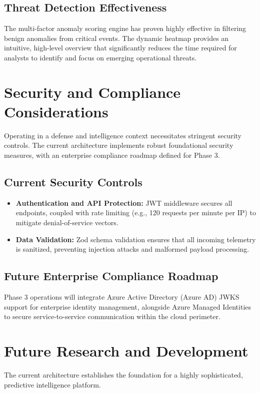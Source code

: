 \documentclass[11pt,a4paper]{article}
\begin{document}
\subsection{Threat Detection Effectiveness}
The multi-factor anomaly scoring engine has proven highly effective in filtering benign anomalies from critical events. The dynamic heatmap provides an intuitive, high-level overview that significantly reduces the time required for analysts to identify and focus on emerging operational threats.

\section{Security and Compliance Considerations}
Operating in a defense and intelligence context necessitates stringent security controls. The current architecture implements robust foundational security measures, with an enterprise compliance roadmap defined for Phase 3.

\subsection{Current Security Controls}
\begin{itemize}
    \item \textbf{Authentication and API Protection:} JWT middleware secures all endpoints, coupled with rate limiting (e.g., 120 requests per minute per IP) to mitigate denial-of-service vectors.
    \item \textbf{Data Validation:} Zod schema validation ensures that all incoming telemetry is sanitized, preventing injection attacks and malformed payload processing.
\end{itemize}

\subsection{Future Enterprise Compliance Roadmap}
Phase 3 operations will integrate Azure Active Directory (Azure AD) JWKS support for enterprise identity management, alongside Azure Managed Identities to secure service-to-service communication within the cloud perimeter.

\section{Future Research and Development}
The current architecture establishes the foundation for a highly sophisticated, predictive intelligence platform.
\end{document}

